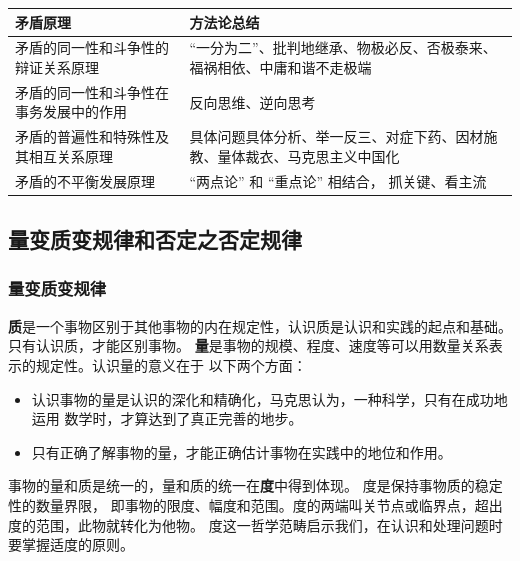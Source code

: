 \documentclass[10pt, UTF8]{book} %
\begin{document}
{ %
\label{矛盾分析方法} %
\begin{longtable}{p{}p{}}
    \toprule
    \textbf{矛盾原理} & \textbf{方法论总结} \\
    \toprule
    \endhead
    \bottomrule
    \endfoot

    矛盾的同一性和斗争性的辩证关系原理 & “一分为二”、批判地继承、物极必反、否极泰来、福祸相依、中庸和谐不走极端 \\ 
    矛盾的同一性和斗争性在事务发展中的作用 & 反向思维、逆向思考 \\ 
    矛盾的普遍性和特殊性及其相互关系原理 & 具体问题具体分析、举一反三、对症下药、因材施教、量体裁衣、马克思主义中国化 \\ 
    矛盾的不平衡发展原理 & “两点论” 和 “重点论” 相结合， 抓关键、看主流 \\
\end{longtable}}

\subsection{量变质变规律和否定之否定规律}

\subsubsection{量变质变规律}

\textbf{质}是一个事物区别于其他事物的内在规定性，认识质是认识和实践的起点和基础。
只有认识质，才能区别事物。
\textbf{量}是事物的规模、程度、速度等可以用数量关系表示的规定性。认识量的意义在于
以下两个方面：
\begin{itemize}[itemsep=0pt]
    \item 认识事物的量是认识的深化和精确化，马克思认为，一种科学，只有在成功地运用
    数学时，才算达到了真正完善的地步。
    \item 只有正确了解事物的量，才能正确估计事物在实践中的地位和作用。
\end{itemize}

事物的量和质是统一的，量和质的统一在\textbf{度}中得到体现。
度是保持事物质的稳定性的数量界限，
即事物的限度、幅度和范围。度的两端叫关节点或临界点，超出度的范围，此物就转化为他物。
度这一哲学范畴启示我们，在认识和处理问题时要掌握适度的原则。
\end{document}
